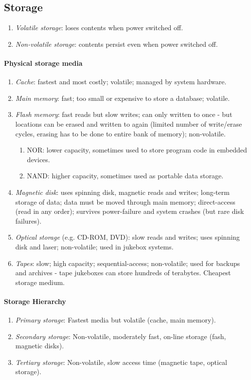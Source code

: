 \documentclass[twocolumn,english]{article}
\begin{document}
\subsection{Storage}
\begin{enumerate}
\item \emph{Volatile storage}: loses contents when power switched off.
\item \emph{Non-volatile storage}: contents persist even when power switched
off.
\end{enumerate}

\paragraph{Physical storage media}
\begin{enumerate}
\item \emph{Cache}: fastest and most costly; volatile; managed by system
hardware.
\item \emph{Main memory}: fast; too small or expensive to store a database;
volatile.
\item \emph{Flash memory}: fast reads but slow writes; can only written
to once - but locations can be erased and written to again (limited
number of write/erase cycles, erasing has to be done to entire bank
of memory); non-volatile.

\begin{enumerate}
\item NOR: lower capacity, sometimes used to store program code in embedded
devices.
\item NAND: higher capacity, sometimes used as portable data storage.
\end{enumerate}
\item \emph{Magnetic disk}: uses spinning disk, magnetic reads and writes;
long-term storage of data; data must be moved through main memory;
direct-access (read in any order); survives power-failure and system
crashes (but rare disk failures).
\item \emph{Optical storage} (e.g. CD-ROM, DVD): slow reads and writes;
uses spinning disk and laser; non-volatile; used in jukebox systems.
\item \emph{Tapes}: slow; high capacity; sequential-access; non-volatile;
used for backups and archives - tape jukeboxes can store hundreds
of terabytes. Cheapest storage medium.
\end{enumerate}

\paragraph{Storage Hierarchy}
\begin{enumerate}
\item \emph{Primary storage}: Fastest media but volatile (cache, main memory).
\item \emph{Secondary storage}: Non-volatile, moderately fast, on-line storage
(fash, magnetic disks).
\item \emph{Tertiary storage}: Non-volatile, slow access time (magnetic
tape, optical storage).
\end{enumerate}
\end{document}
